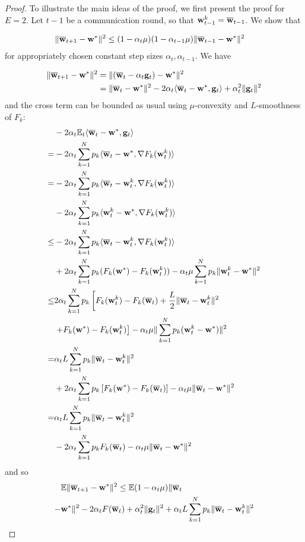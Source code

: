 \begin{proof}
	To illustrate the main ideas of the proof, we first present the proof
	for $E=2$. Let $t-1$ be a communication round, so that ${\mathbf{w}}_{t-1}^{k}={\overline{\mathbf{w}}}_{t-1}$.
	We show that 
	
	\begin{align*}
	\|{\overline{\mathbf{w}}}_{t+1}-{\mathbf{w}}^{\ast}\|^{2} & \leq(1-\alpha_{t}\mu)(1-\alpha_{t-1}\mu)\|{\overline{\mathbf{w}}}_{t-1}-{\mathbf{w}}^{\ast}\|^{2}
	\end{align*}
	for appropriately chosen constant step sizes $\alpha_{t},\alpha_{t-1}$.
	We have 
	
	\begin{align*}
	\|{\overline{\mathbf{w}}}_{t+1}-{\mathbf{w}}^{\ast}\|^{2} & =\|({\overline{\mathbf{w}}}_{t}-\alpha_{t}{\mathbf{g}}_{t})-{\mathbf{w}}^{\ast}\|^{2}\\
	& =\|{\overline{\mathbf{w}}}_{t}-{\mathbf{w}}^{\ast}\|^{2}-2\alpha_{t}\langle{\overline{\mathbf{w}}}_{t}-{\mathbf{w}}^{\ast},{\mathbf{g}}_{t}\rangle+\alpha_{t}^{2}\|{\mathbf{g}}_{t}\|^{2}
	\end{align*}
	and the cross term can be bounded as usual using $\mu$-convexity
	and $L$-smoothness of $F_{k}$:
	\begin{align*}
	&-2\alpha_{t}\mathbb{E}_{t}\langle{\overline{\mathbf{w}}}_{t}-{\mathbf{w}}^{\ast},{\mathbf{g}}_{t}\rangle\\
	=&-2\alpha_{t}\sum_{k=1}^{N}p_{k}\langle{\overline{\mathbf{w}}}_{t}-{\mathbf{w}}^{\ast},\nabla F_{k}({\mathbf{w}}_{t}^{k})\rangle\\
	=&-2\alpha_{t}\sum_{k=1}^{N}p_{k}\langle{\overline{\mathbf{w}}}_{t}-{\mathbf{w}}_{t}^{k},\nabla F_{k}({\mathbf{w}}_{t}^{k})\rangle \\
	& -2\alpha_{t}\sum_{k=1}^{N}p_{k}\langle {\mathbf{w}}_{t}^{k}-{\mathbf{w}}^{\ast},\nabla F_{k}({\mathbf{w}}_{t}^{k})\rangle\\
	\leq&-2\alpha_{t}\sum_{k=1}^{N}p_{k}\langle{\overline{\mathbf{w}}}_{t}-{\mathbf{w}}_{t}^{k},\nabla F_{k}({\mathbf{w}}_{t}^{k})\rangle\\
	& +2\alpha_{t}\sum_{k=1}^{N}p_{k}(F_{k}({\mathbf{w}}^{\ast})-F_{k}({\mathbf{w}}_{t}^{k}))-\alpha_{t}\mu\sum_{k=1}^{N}p_{k}\|{\mathbf{w}}_{t}^{k}-{\mathbf{w}}^{\ast}\|^{2}\\
	\leq&2\alpha_{t}\sum_{k=1}^{N}p_{k}\left[F_{k}({\mathbf{w}}_{t}^{k})-F_{k}({\overline{\mathbf{w}}}_{t})+\frac{L}{2}\|{\overline{\mathbf{w}}}_{t}-{\mathbf{w}}_{t}^{k}\|^{2}\right.\\
	&\left.+F_{k}({\mathbf{w}}^{\ast})-F_{k}({\mathbf{w}}_{t}^{k})\right]-\alpha_{t}\mu\|\sum_{k=1}^{N}p_{k}({\mathbf{w}}_{t}^{k}-{\mathbf{w}}^{\ast})\|^{2}\\
	=&\alpha_{t}L\sum_{k=1}^{N}p_{k}\|{\overline{\mathbf{w}}}_{t}-{\mathbf{w}}_{t}^{k}\|^{2}\\ &+2\alpha_{t}\sum_{k=1}^{N}p_{k}\left[F_{k}({\mathbf{w}}^{\ast})-F_{k}({\overline{\mathbf{w}}}_{t})\right]-\alpha_{t}\mu\|{\overline{\mathbf{w}}}_{t}-{\mathbf{w}}^{\ast}\|^{2}\\
	=&\alpha_{t}L\sum_{k=1}^{N}p_{k}\|{\overline{\mathbf{w}}}_{t}-{\mathbf{w}}_{t}^{k}\|^{2}\\ &-2\alpha_{t}\sum_{k=1}^{N}p_{k}F_{k}({\overline{\mathbf{w}}}_{t})-\alpha_{t}\mu\|{\overline{\mathbf{w}}}_{t}-{\mathbf{w}}^{\ast}\|^{2}
	\end{align*}
	and so 
	\begin{align*}
	& \mathbb{E}\|{\overline{\mathbf{w}}}_{t+1}-{\mathbf{w}}^{\ast}\|^{2}  \leq\mathbb{E}(1-\alpha_{t}\mu)\|{\overline{\mathbf{w}}}_{t}\\
	-& {\mathbf{w}}^{\ast}\|^{2}-2\alpha_{t}F({\overline{\mathbf{w}}}_{t})+\alpha_{t}^{2}\|{\mathbf{g}}_{t}\|^{2}+\alpha_{t}L\sum_{k=1}^{N}p_{k}\|{\overline{\mathbf{w}}}_{t}-{\mathbf{w}}_{t}^{k}\|^{2}
	\end{align*}
	

\end{proof}

